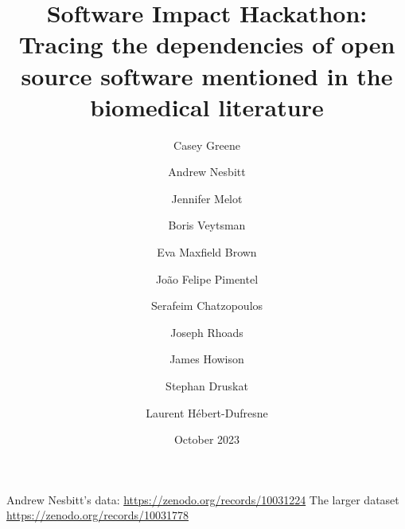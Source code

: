 \documentclass{article}
\title{Software Impact Hackathon:  Tracing the dependencies of open
  source software mentioned in the biomedical literature}
\date{October 2023}
\author{Casey Greene \and
Andrew Nesbitt \and
Jennifer Melot \and
Boris Veytsman \and
Eva Maxfield Brown \and
João Felipe Pimentel \and
Serafeim Chatzopoulos \and
Joseph Rhoads \and
James Howison \and
Stephan Druskat \and
Laurent H\'ebert-Dufresne}
\begin{document}
\maketitle

Andrew Nesbitt's data: \url{https://zenodo.org/records/10031224}
The larger dataset \url{https://zenodo.org/records/10031778} 
\end{document}
